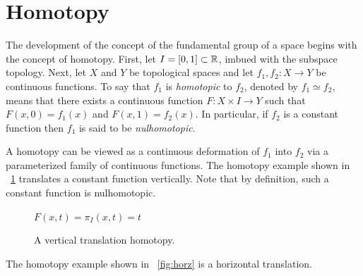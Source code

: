 \documentclass[letterpaper,12pt,fleqn]{article}
\begin{document}
\section*{Homotopy}

The development of the concept of the fundamental group of a space begins with the concept of homotopy.  First, let
\(I=[0,1]\subset\mathbb{R}\), imbued with the subspace topology.  Next, let \(X\) and \(Y\) be topological spaces and let
\(f_1,f_2:X\to Y\) be continuous functions.  To say that \(f_1\) is \emph{homotopic} to \(f_2\), denoted by
\(f_1\simeq f_2\), means that there exists a continuous function \(F:X\times I\to Y\) such that \(F(x,0)=f_1(x)\)
and \(F(x,1)=f_2(x)\).  In particular, if \(f_2\) is a constant function then \(f_1\) is said to be
\emph{nulhomotopic}.

A homotopy can be viewed as a continuous deformation of \(f_1\) into \(f_2\) via a parameterized family of continuous
functions.  The homotopy example shown in \figurename\ \ref{fig:vert} translates a constant function vertically.
Note that by definition, such a constant function is nulhomotopic.

\begin{figure}[H]
  \centering

  \(F(x,t)=\pi_I(x,t)=t\)
  \caption{A vertical translation homotopy.}
  \label{fig:vert}
\end{figure}

The homotopy example shown in \figurename\ \ref{fig:horz} is a horizontal translation.
\end{document}
